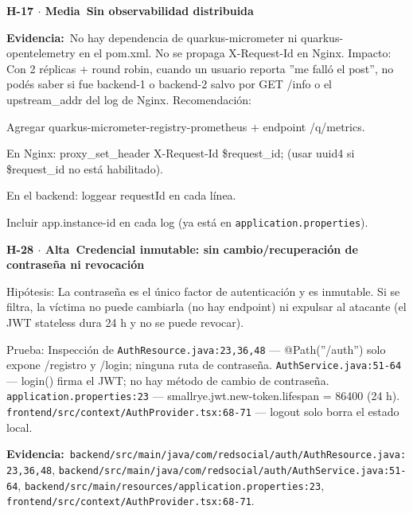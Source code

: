 \documentclass[10pt,a4paper]{article}
\newcommand{\code}[1]{\nolinkurl{#1}}
\newcommand{\badgeAlta}{\colorbox{orange!20}{\textcolor{orange!90!black}{\textbf{\footnotesize Alta}}}}
\newcommand{\badgeMedia}{\colorbox{yellow!35}{\textcolor{brown!90!black}{\textbf{\footnotesize Media}}}}
\begin{document}
\vspace{0.8em}\noindent\textbf{\large H-17 $\cdot$ \badgeMedia\  Sin observabilidad distribuida}\par\vspace{0.3em}
\noindent\textbf{Evidencia:}\ No hay dependencia de quarkus-micrometer ni quarkus-opentelemetry en el pom.xml. No se propaga X-Request-Id en Nginx.  Impacto: Con 2 réplicas + round robin, cuando un usuario reporta ''me falló el post'', no podés saber si fue backend-1 o backend-2 salvo por GET /info o el upstream\_addr del log de Nginx.  Recomendación:\par\vspace{0.4em}
Agregar quarkus-micrometer-registry-prometheus + endpoint /q/metrics.\par\vspace{0.4em}
En Nginx: proxy\_set\_header X-Request-Id \$request\_id; (usar uuid4 si \$request\_id no está habilitado).\par\vspace{0.4em}
En el backend: loggear requestId en cada línea.\par\vspace{0.4em}
Incluir app.instance-id en cada log (ya está en \code{application.properties}).\par\vspace{0.4em}
\vspace{0.8em}\noindent\textbf{\large H-28 $\cdot$ \badgeAlta\  Credencial inmutable: sin cambio/recuperación de contraseña ni revocación}\par\vspace{0.3em}
Hipótesis: La contraseña es el único factor de autenticación y es inmutable. Si se filtra, la víctima no puede cambiarla (no hay endpoint) ni expulsar al atacante (el JWT stateless dura 24 h y no se puede revocar).\par\vspace{0.4em}
Prueba: Inspección de \code{AuthResource.java:23,36,48} --- @Path(''/auth'') solo expone /registro y /login; ninguna ruta de contraseña. \code{AuthService.java:51-64} --- login() firma el JWT; no hay método de cambio de contraseña. \code{application.properties:23} --- smallrye.jwt.new-token.lifespan = 86400 (24 h). \code{frontend/src/context/AuthProvider.tsx:68-71} --- logout solo borra el estado local.\par\vspace{0.4em}
\noindent\textbf{Evidencia:}\ \code{backend/src/main/java/com/redsocial/auth/AuthResource.java:23,36,48}, \code{backend/src/main/java/com/redsocial/auth/AuthService.java:51-64}, \code{backend/src/main/resources/application.properties:23}, \code{frontend/src/context/AuthProvider.tsx:68-71}.\par\vspace{0.4em}
\end{document}
